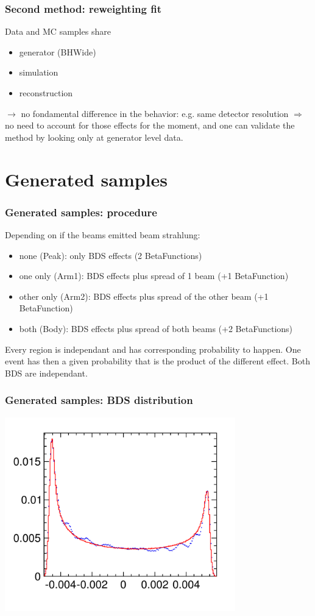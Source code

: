 \documentclass{beamer}
\begin{document}
\begin{frame}
\frametitle{Second method: reweighting fit}
Data and MC samples share 
\begin{itemize}
  \item generator (BHWide)
  \item simulation
  \item reconstruction
\end{itemize}
$\to$ no fondamental difference in the behavior: e.g. same
detector resolution $\Rightarrow$ no need to account for those effects for the
moment, and one can validate the method by looking only at generator level data.
\end{frame}

\section{Generated samples}
\begin{frame}
\frametitle{Generated samples: procedure}
Depending on if the beams emitted beam strahlung: 
\begin{itemize}
  \item none (Peak): only BDS effects (2 BetaFunctions)
  \item one only (Arm1): BDS effects plus spread of 1 beam (+1 BetaFunction)
  \item other only (Arm2): BDS effects plus spread of the other beam (+1
  BetaFunction)
  \item both (Body): BDS effects plus spread of both beams (+2 BetaFunctions)
\end{itemize}
Every region is independant and has corresponding probability to happen. One
event has then a given probability that is the product of the different effect.
Both BDS are independant.
\end{frame}
\begin{frame}
\frametitle{Generated samples: BDS distribution}
\includegraphics[width=10cm]{MCBeamSpread}
\end{frame}
\end{document}
